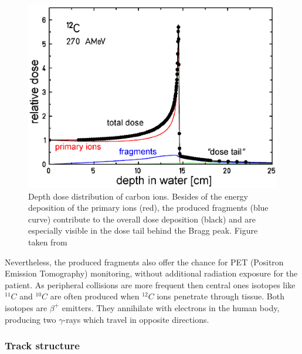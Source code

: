 \begin{figure}[H]
\begin{center}
\includegraphics[scale=0.3]{./teile/introduction/iondepthdosesum.png}
\caption{Depth dose distribution of carbon ions. Besides of the energy deposition of the primary ions (red), the produced fragments 
(blue curve) contribute to the overall dose deposition (black) and are especially visible in the dose tail behind the Bragg 
peak. Figure taken from \cite{Gro04}}
\label{int:frag:fig}
\end{center}
\end{figure}

Nevertheless, the produced fragments  also offer the chance for PET (Positron Emission Tomography) monitoring, 
without additional radiation exposure for the patient. As peripheral collisions are more frequent then central ones \cite{Kra00} 
isotopes like $^{11}C$ and $^{10}C$ are often produced when $^{12}C$ ions penetrate through tissue. Both isotopes are $\beta^{+}$ 
emitters. They annihilate with electrons in the human body, producing two $\gamma$-rays which travel in opposite directions.


\subsubsection{Track structure}

